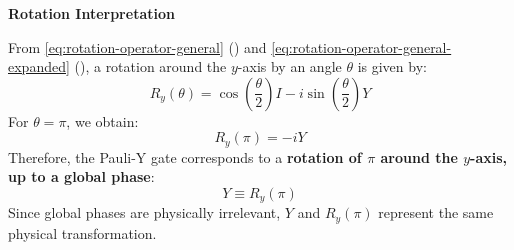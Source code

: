 \highspace
\begin{flushleft}
    \textcolor{Green3}{ \textbf{Rotation Interpretation}}
\end{flushleft}
From \autoref{eq:rotation-operator-general} () and \autoref{eq:rotation-operator-general-expanded} (), a rotation around the $y$-axis by an angle $\theta$ is given by:
\begin{equation*}
    R_y(\theta) = \cos\left(\frac{\theta}{2}\right) I - i \sin\left(\frac{\theta}{2}\right) Y
\end{equation*}
For $\theta = \pi$, we obtain:
\begin{equation*}
    R_y(\pi) = -iY
\end{equation*}
Therefore, the Pauli-Y gate corresponds to a \textbf{rotation of $\pi$ around the $y$-axis, up to a global phase}:
\begin{equation*}
    Y \equiv R_y(\pi)
\end{equation*}
Since global phases are physically irrelevant, $Y$ and $R_y(\pi)$ represent the same physical transformation.

